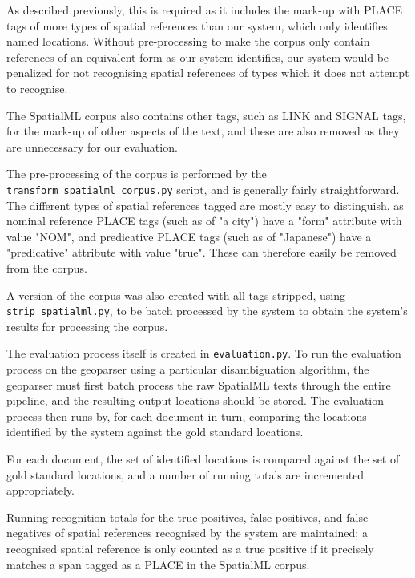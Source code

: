 \documentclass[12pt, a4paper]{report}
\begin{document}
As described previously, this is required as it includes the mark-up with PLACE tags of more types of spatial references than our system, which only identifies named locations. Without pre-processing to make the corpus only contain references of an equivalent form as our system identifies, our system would be penalized for not recognising spatial references of types which it does not attempt to recognise.

The SpatialML corpus also contains other tags, such as LINK and SIGNAL tags, for the mark-up of other aspects of the text, and these are also removed as they are unnecessary for our evaluation.

The pre-processing of the corpus is performed by the \verb#transform_spatialml_corpus.py# script, and is generally fairly straightforward. The different types of spatial references tagged are mostly easy to distinguish, as nominal reference PLACE tags (such as of "a city") have a "form" attribute with value "NOM", and predicative PLACE tags (such as of "Japanese") have a "predicative" attribute with value "true". These can therefore easily be removed from the corpus.

A version of the corpus was also created with all tags stripped, using \verb#strip_spatialml.py#, to be batch processed by the system to obtain the system's results for processing the corpus.

The evaluation process itself is created in \verb#evaluation.py#. To run the evaluation process on the geoparser using a particular disambiguation algorithm, the geoparser must first batch process the raw SpatialML texts through the entire pipeline, and the resulting output locations should be stored. The evaluation process then runs by, for each document in turn, comparing the locations identified by the system against the gold standard locations.


For each document, the set of identified locations is compared against the set of gold standard locations, and a number of running totals are incremented appropriately.

Running recognition totals for the true positives, false positives, and false negatives of spatial references recognised by the system are maintained; a recognised spatial reference is only counted as a true positive if it precisely matches a span tagged as a PLACE in the SpatialML corpus.
\end{document}
